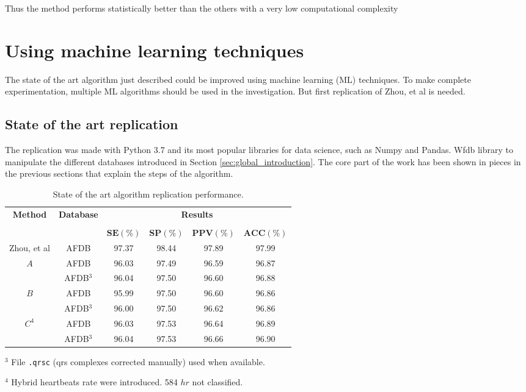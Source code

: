 Thus the method performs statistically better than the others \cite[p. 11]{zhou2015} with a very low computational complexity \cite[p. 14]{zhou2015}

\section{Using machine learning techniques}
The state of the art algorithm just described could be improved using machine learning (ML) techniques. To make complete experimentation, multiple ML algorithms should be used in the investigation. But first replication of Zhou, et al\cite{zhou2015} is needed.

\subsection{State of the art replication}
The replication was made with Python 3.7 and its most popular libraries for data science, such as Numpy and Pandas. Wfdb library to manipulate the different databases introduced in Section \ref{sec:global_introduction}.
The core part of the work has been shown in pieces in the previous sections that explain the steps of the algorithm.

\begin{table}[h]
\begin{center}
\begin{threeparttable}
\caption[State of the art algorithm replication performance.]{State of the art algorithm replication performance.}
\label{table:zhou_hr_and_unimol}
\scriptsize
  \begin{tabular}{c c c c c c}
  \toprule
  \textbf{Method} & \textbf{Database} & \multicolumn{4}{c}{\textbf{Results}} \\
  \cline{3-6}
  \\
  & & $\mathbf{SE(\%)}$ & $\mathbf{SP(\%)}$ & $\mathbf{PPV(\%)}$ & $\mathbf{ACC(\%)}$\\
  \midrule  
  Zhou, et al\cite{zhou2015} & AFDB & 97.37 & 98.44 & 97.89 & 97.99 \\
  \hline
  $A$ & AFDB & 96.03 & 97.49 & 96.59 & 96.87 \\
  & AFDB$^3$ & 96.04 & 97.50 & 96.60 & 96.88 \\
  \hline
  $B$ & AFDB & 95.99 & 97.50 & 96.60 & 96.86 \\
  & AFDB$^3$ & 96.00 & 97.50 & 96.62 & 96.86 \\
  \hline
  $C^4$ & AFDB & 96.03 & 97.53 & 96.64 & 96.89 \\
  & AFDB$^3$ & 96.04 & 97.53 & 96.66 & 96.90 \\
  \bottomrule
\end{tabular}
\begin{tablenotes}
 	\item $^3$ File \verb|.qrsc| (qrs complexes corrected manually) used when available.
 	\item $^4$ Hybrid heartbeats rate were introduced. 584 $hr$ not classified.
    \end{tablenotes}
\end{threeparttable}
\end{center}
\end{table}

